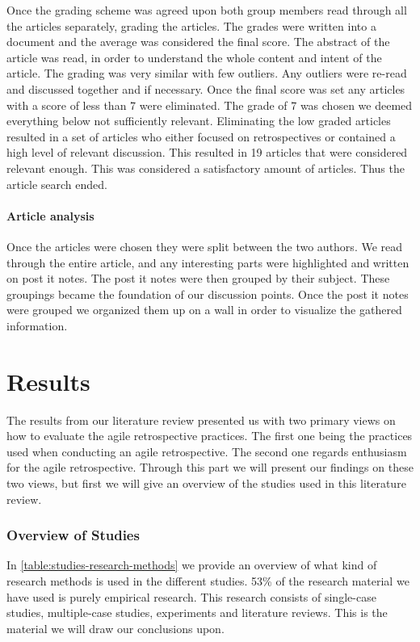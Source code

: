 \documentclass[12pt]{article}
\begin{document}
Once the grading scheme was agreed upon both group members read through all the articles separately, grading the articles. The grades were written into a document and the average was considered the final score. The abstract of the article was read, in order to understand the whole content and intent of the article. The grading was very similar with few outliers. Any outliers were re-read and discussed together and if necessary. Once the final score was set any articles with a score of less than 7 were eliminated. The grade of 7 was chosen we deemed everything below not sufficiently relevant. Eliminating the low graded articles resulted in a set of articles who either focused on retrospectives or contained a high level of relevant discussion. This resulted in 19 articles that were considered relevant enough. This was considered a satisfactory amount of articles. Thus the article search ended.

\subsection{Article analysis}

Once the articles were chosen they were split between the two authors. We read through the entire article, and any interesting parts were highlighted and written on post it notes. The post it notes were then grouped by their subject. These groupings became the foundation of our discussion points. Once the post it notes were grouped we organized them up on a wall in order to visualize the gathered information. 

\clearpage

\part{Results}
The results from our literature review presented us with two primary views on how to evaluate the agile retrospective practices. The first one being the practices used when conducting an agile retrospective. The second one regards enthusiasm for the agile retrospective. Through this part we will present our findings on these two views, but first we will give an overview of the studies used in this literature review. 

\section{Overview of Studies}
In \autoref{table:studies-research-methods} we provide an overview of what kind of research methods is used in the different studies. 53\% of the research material we have used is purely empirical research. This research consists of single-case studies, multiple-case studies, experiments and literature reviews. This is the material we will draw our conclusions upon.
\end{document}
